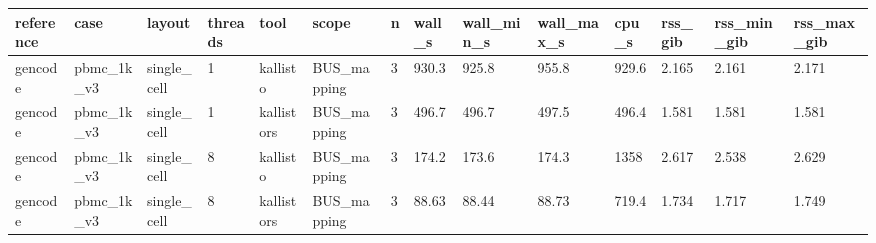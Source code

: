 \begin{tabular}{llllllllllllll}
\toprule
reference & case & layout & threads & tool & scope & n & wall\_s & wall\_min\_s & wall\_max\_s & cpu\_s & rss\_gib & rss\_min\_gib & rss\_max\_gib \\
\midrule
gencode & pbmc\_1k\_v3 & single\_cell & 1 & kallisto & BUS\_mapping & 3 & 930.3 & 925.8 & 955.8 & 929.6 & 2.165 & 2.161 & 2.171 \\
gencode & pbmc\_1k\_v3 & single\_cell & 1 & kallistors & BUS\_mapping & 3 & 496.7 & 496.7 & 497.5 & 496.4 & 1.581 & 1.581 & 1.581 \\
gencode & pbmc\_1k\_v3 & single\_cell & 8 & kallisto & BUS\_mapping & 3 & 174.2 & 173.6 & 174.3 & 1358 & 2.617 & 2.538 & 2.629 \\
gencode & pbmc\_1k\_v3 & single\_cell & 8 & kallistors & BUS\_mapping & 3 & 88.63 & 88.44 & 88.73 & 719.4 & 1.734 & 1.717 & 1.749 \\
\bottomrule
\end{tabular}
